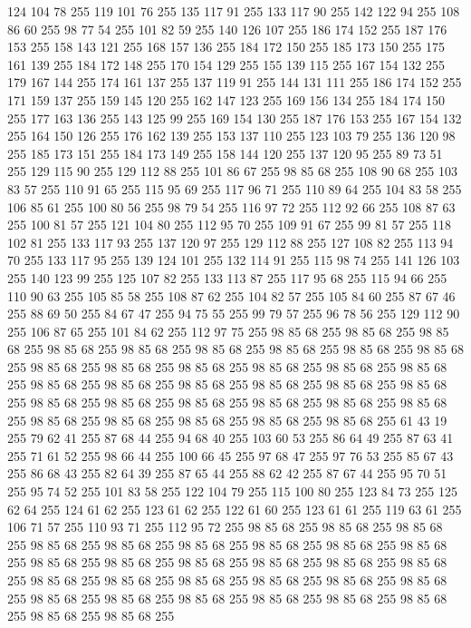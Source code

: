 124 104 78 255 119 101 76 255 135 117 91 255 133 117 90 255 142 122 94 255 108 86 60 255 98 77 54 255 101 82 59 255 140 126 107 255 186 174 152 255 187 176 153 255 158 143 121 255 168 157 136 255 184 172 150 255 185 173 150 255 175 161 139 255 184 172 148 255 170 154 129 255 155 139 115 255 167 154 132 255 179 167 144 255 174 161 137 255 137 119 91 255 144 131 111 255 186 174 152 255 171 159 137 255 159 145 120 255 162 147 123 255 169 156 134 255 184 174 150 255 177 163 136 255 143 125 99 255 169 154 130 255 187 176 153 255 167 154 132 255 164 150 126 255 176 162 139 255 153 137 110 255 123 103 79 255 136 120 98 255 185 173 151 255 184 173 149 255 158 144 120 255 137 120 95 255 89 73 51 255 129 115 90 255 129 112 88 255 101 86 67 255 98 85 68 255 108 90 68 255 103 83 57 255 110 91 65 255 115 95 69 255 117 96 71 255 110 89 64 255 104 83 58 255 106 85 61 255 100 80 56 255 98 79 54 255 116 97 72 255 112 92 66 255 108 87 63 255 100 81 57 255 121 104 80 255
112 95 70 255 109 91 67 255 99 81 57 255 118 102 81 255 133 117 93 255 137 120 97 255 129 112 88 255 127 108 82 255 113 94 70 255 133 117 95 255 139 124 101 255 132 114 91 255 115 98 74 255 141 126 103 255 140 123 99 255 125 107 82 255 133 113 87 255 117 95 68 255 115 94 66 255 110 90 63 255 105 85 58 255 108 87 62 255 104 82 57 255 105 84 60 255 87 67 46 255 88 69 50 255 84 67 47 255 94 75 55 255 99 79 57 255 96 78 56 255 129 112 90 255 106 87 65 255 101 84 62 255 112 97 75 255 98 85 68 255 98 85 68 255 98 85 68 255 98 85 68 255 98 85 68 255 98 85 68 255 98 85 68 255 98 85 68 255 98 85 68 255 98 85 68 255 98 85 68 255 98 85 68 255 98 85 68 255 98 85 68 255 98 85 68 255 98 85 68 255 98 85 68 255 98 85 68 255 98 85 68 255 98 85 68 255 98 85 68 255 98 85 68 255 98 85 68 255 98 85 68 255 98 85 68 255 98 85 68 255 98 85 68 255 98 85 68 255 98 85 68 255 98 85 68 255
98 85 68 255 98 85 68 255 61 43 19 255 79 62 41 255 87 68 44 255 94 68 40 255 103 60 53 255 86 64 49 255 87 63 41 255 71 61 52 255 98 66 44 255 100 66 45 255 97 68 47 255 97 76 53 255 85 67 43 255 86 68 43 255 82 64 39 255 87 65 44 255 88 62 42 255 87 67 44 255 95 70 51 255 95 74 52 255 101 83 58 255 122 104 79 255 115 100 80 255 123 84 73 255 125 62 64 255 124 61 62 255 123 61 62 255 122 61 60 255 123 61 61 255 119 63 61 255 106 71 57 255 110 93 71 255 112 95 72 255 98 85 68 255 98 85 68 255 98 85 68 255 98 85 68 255 98 85 68 255 98 85 68 255 98 85 68 255 98 85 68 255 98 85 68 255 98 85 68 255 98 85 68 255 98 85 68 255 98 85 68 255 98 85 68 255 98 85 68 255 98 85 68 255 98 85 68 255 98 85 68 255 98 85 68 255 98 85 68 255 98 85 68 255 98 85 68 255 98 85 68 255 98 85 68 255 98 85 68 255 98 85 68 255 98 85 68 255 98 85 68 255 98 85 68 255
